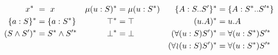 \begin{align*}
    x^{*} \                     &= \ x
        & \mu(u : S)^{*}        &= \mu(u : S^{*})
        & \{A : S .. S'\}^{*}   &= \{A : S^{*} .. S'^{*}\} \\
    \{a : S\}^{*}             &= \{a : S^{*}\}
        & \top^{*}              &= \top
        & (u.A)^{*}             &= u.A \\
    (S \wedge S')^{*}           &= S^{*} \wedge S'^{*}
        & \bot^{*}              &= \bot
        & (\forall(u:S)S')^{*} &= \forall(u:S^{*})S'^{*} \\
    & & & & (\forall\!\wr\!(u:S)S')^{*} &= \forall(u:S^{*})S'^{*} \\
\end{align*}

